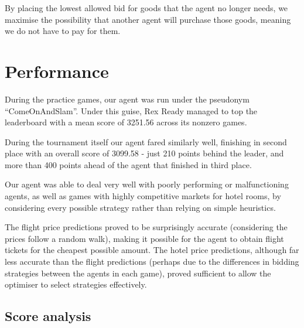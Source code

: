 \documentclass{acm_proc_article-sp}
\begin{document}
By placing the lowest allowed bid for goods that the agent no longer needs, we maximise the possibility that another agent will purchase those goods, meaning we do not have to pay for them.

\section{Performance}

During the practice games, our agent was run under the pseudonym ``ComeOnAndSlam''. Under this guise, Rex Ready managed to top the leaderboard with a mean score of 3251.56 across its nonzero games.

During the tournament itself our agent fared similarly well, finishing in second place with an overall score of 3099.58 - just 210 points behind the leader, and more than 400 points ahead of the agent that finished in third place.

Our agent was able to deal very well with poorly performing or malfunctioning agents, as well as games with highly competitive markets for hotel rooms, by considering every possible strategy rather than relying on simple heuristics.

The flight price predictions proved to be surprisingly accurate (considering the prices follow a random walk), making it possible for the agent to obtain flight tickets for the cheapest possible amount. The hotel price predictions, although far less accurate than the flight predictions (perhaps due to the differences in bidding strategies between the agents in each game), proved sufficient to allow the optimiser to select strategies effectively.

\subsection{Score analysis}
\end{document}
